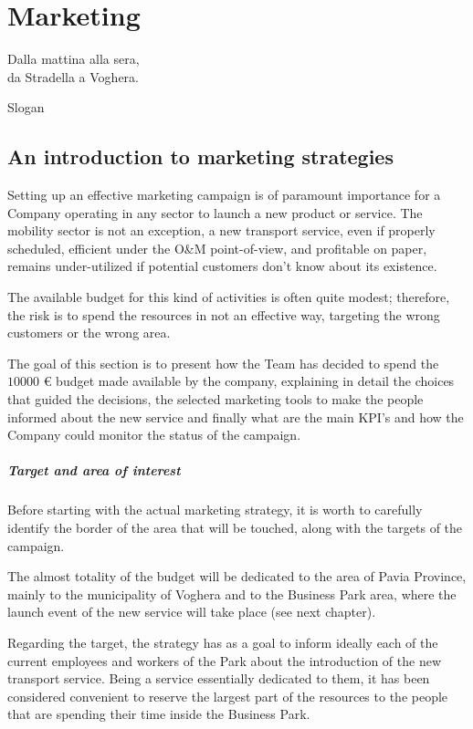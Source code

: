 \chapter{Marketing}

\epigraph{Dalla mattina alla sera,\\ da Stradella a Voghera.}{Slogan}
\section{An introduction to marketing strategies}
Setting up an effective marketing campaign is of paramount importance for a Company operating in any sector to launch a new product or service. The mobility sector is not an exception, a new transport service, even if properly scheduled, efficient under the O\&M point-of-view, and profitable on paper, remains under-utilized if potential customers don’t know about its existence.

The available budget for this kind of activities is often quite modest; therefore, the risk is to spend the resources in not an effective way, targeting the wrong customers or the wrong area.

The goal of this section is to present how the Team has decided to spend the $10000$ € budget made available by the company, explaining in detail the choices that guided the decisions, the selected marketing tools to make the people informed about the new service and finally what are the main KPI’s and how the Company could monitor the status of the campaign.

\paragraph{Target and area of interest}
Before starting with the actual marketing strategy, it is worth to carefully identify the border of the area that will be touched, along with the targets of the campaign.

The almost totality of the budget will be dedicated to the area of Pavia Province, mainly to the municipality of Voghera and to the Business Park area, where the launch event of the new service will take place (see next chapter).

Regarding the target, the strategy has as a goal to inform ideally each of the current employees and workers of the Park about the introduction of the new transport service. Being a service essentially dedicated to them, it has been considered convenient to reserve the largest part of the resources to the people that are spending their time inside the Business Park.

